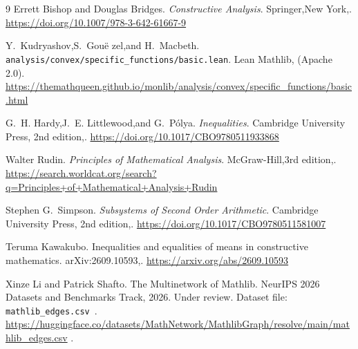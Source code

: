 \documentclass[11pt,reqno]{amsart}
\theoremstyle{redplain}
\numberwithin{equation}{section}
\begin{document}
\begin{thebibliography}{9}
 Errett Bishop and Douglas Bridges. \newblock%
\emph{Constructive Analysis}. \newblock Springer,\thinspace \allowbreak New
York,\thinspace {}. \newblock%
\url{https://doi.org/10.1007/978-3-642-61667-9}

 Y.~Kudryashov,\thinspace \allowbreak S.~Gou\"{e}%
zel,\thinspace \allowbreak and H.~Macbeth. \newblock\texttt{%
analysis/convex/specific\_functions/basic.lean}. \newblock Lean
Mathlib,\thinspace {} (Apache 2.0). \newblock%
\url{https://themathqueen.github.io/monlib/analysis/convex/specific_functions/basic.html}

 G.~H. Hardy,\thinspace \allowbreak J.~E.
Littlewood,\thinspace \allowbreak and G.~P\'{o}lya. \newblock\emph{%
Inequalities}. \newblock Cambridge University Press,\thinspace \allowbreak
2nd edition,\thinspace {}. \newblock%
\url{https://doi.org/10.1017/CBO9780511933868}

 Walter Rudin. \newblock\emph{Principles of Mathematical
Analysis}. \newblock McGraw-Hill,\thinspace \allowbreak 3rd
edition,\thinspace {}. \newblock%
\url{https://search.worldcat.org/search?q=Principles+of+Mathematical+Analysis+Rudin}

 Stephen G.~Simpson. \newblock\emph{Subsystems of
Second Order Arithmetic}. \newblock Cambridge University Press,\thinspace
\allowbreak 2nd edition,\thinspace {}. \newblock%
\url{https://doi.org/10.1017/CBO9780511581007}

 Teruma Kawakubo. \newblock Inequalities and
equalities of means in constructive mathematics. \newblock %
arXiv:2609.10593,\thinspace {}. \newblock%
\url{https://arxiv.org/abs/2609.10593}

 Xinze Li and Patrick Shafto. \newblock The
Multinetwork of Mathlib. \newblock NeurIPS 2026 Datasets and Benchmarks
Track, 2026. Under review. \newblock Dataset file: \texttt{mathlib\_edges.csv%
}. \newblock%
\url{https://huggingface.co/datasets/MathNetwork/MathlibGraph/resolve/main/mathlib_edges.csv}%
.
\end{thebibliography}
\end{document}
